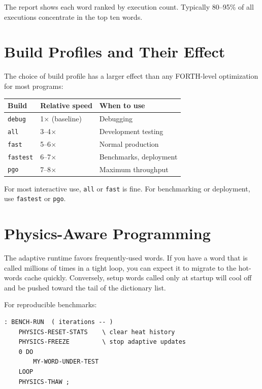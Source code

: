 The report shows each word ranked by execution count. Typically 80--95\% of
all executions concentrate in the top ten words.

\section{Build Profiles and Their Effect}
\label{sec:build-profiles}

The choice of build profile has a larger effect than any FORTH-level
optimization for most programs:

\begin{center}
\begin{tabular}{lll}
\toprule
Build & Relative speed & When to use \\
\midrule
\texttt{debug}   & 1$\times$ (baseline) & Debugging \\
\texttt{all}     & 3--4$\times$ & Development testing \\
\texttt{fast}    & 5--6$\times$ & Normal production \\
\texttt{fastest} & 6--7$\times$ & Benchmarks, deployment \\
\texttt{pgo}     & 7--8$\times$ & Maximum throughput \\
\bottomrule
\end{tabular}
\end{center}

For most interactive use, \texttt{all} or \texttt{fast} is fine. For
benchmarking or deployment, use \texttt{fastest} or \texttt{pgo}.

\section{Physics-Aware Programming}
\label{sec:physics-aware}

The adaptive runtime favors frequently-used words. If you have a word that is
called millions of times in a tight loop, you can expect it to migrate to the
hot-words cache quickly. Conversely, setup words called only at startup will
cool off and be pushed toward the tail of the dictionary list.

For reproducible benchmarks:

\begin{lstlisting}[language=Forth]
: BENCH-RUN  ( iterations -- )
    PHYSICS-RESET-STATS    \ clear heat history
    PHYSICS-FREEZE         \ stop adaptive updates
    0 DO
        MY-WORD-UNDER-TEST
    LOOP
    PHYSICS-THAW ;
\end{lstlisting}

